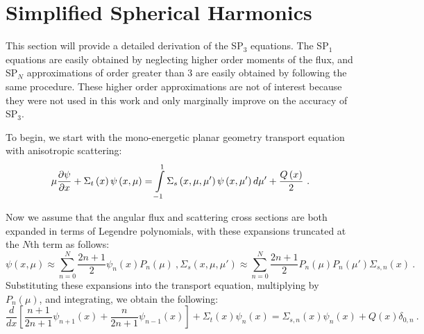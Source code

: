 \section{Simplified Spherical Harmonics}\label{appsec:SPn}

This section will provide a detailed derivation of the SP$_3$ equations.  The SP$_1$ equations are easily obtained by neglecting higher order moments of the flux, and SP$_N$ approximations of order greater than 3 are easily obtained by following the same procedure.  These higher order approximations are not of interest because they were not used in this work and only marginally improve on the accuracy of SP$_3$.

To begin, we start with the mono-energetic planar geometry transport equation with anisotropic scattering:
\begin{equation}
\mu\frac{\partial \psi}{\partial x} + \Sigma_{t}\left(x\right) \psi\left(x,\mu\right) = \intop_{-1}^1 \Sigma_{s}\left(x,\mu,\mu'\right) \psi\left(x,\mu'\right) d\mu' + \frac{Q\left(x\right)}{2}\ .
\end{equation}

Now we assume that the angular flux and scattering cross sections are both expanded in terms of Legendre polynomials, with these expansions truncated at the $N$th term as follows:
\begin{subequations}
\begin{equation}
\psi\left(x,\mu\right) \approx \sum_{n=0}^N \frac{2n+1}{2} \psi_{n}\left(x\right) P_n\left(\mu\right)\ ,
\end{equation}
\begin{equation}
\Sigma_{s}\left(x,\mu,\mu'\right) \approx \sum_{n=0}^N \frac{2n+1}{2} P_n\left(\mu\right)P_n\left(\mu'\right)\Sigma_{s,n}\left(x\right)\ .
\end{equation}
\end{subequations}
Substituting these expansions into the transport equation, multiplying by $P_n\left(\mu\right)$, and integrating, we obtain the following:
\begin{equation}\label{e:SPnGeneral}
\frac{d}{dx}\left[\frac{n+1}{2n+1}\psi_{n+1}\left(x\right) + \frac{n}{2n+1}\psi_{n-1}\left(x\right)\right] + \Sigma_{t}\left(x\right) \psi_{n}\left(x\right) = \Sigma_{s,n}\left(x\right) \psi_n\left(x\right) + Q\left(x\right)\delta_{0,n}\ .
\end{equation}

